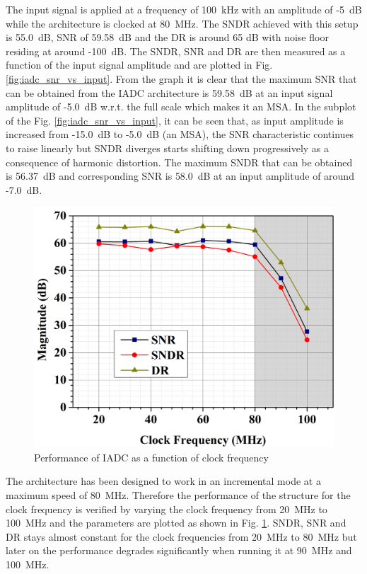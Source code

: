 The input signal is applied at a frequency of 100~kHz with an amplitude of -5~dB while the architecture is clocked at 80~MHz. The SNDR achieved with this setup is 55.0~dB, SNR of 59.58~dB and the DR is around 65 dB with noise floor residing at around -100~dB. The SNDR, SNR and DR are then measured as a function of the input signal amplitude and are plotted in Fig. \ref{fig:iadc_snr_vs_input}. From the graph it is clear that the maximum SNR that can be obtained from the IADC architecture is 59.58~dB at an input signal amplitude of -5.0~dB w.r.t. the full scale which makes it an MSA. In the subplot of the Fig. \ref{fig:iadc_snr_vs_input}, it can be seen that, as input amplitude is increased from -15.0~dB to -5.0~dB (an MSA), the SNR characteristic continues to raise linearly but SNDR diverges starts shifting down progressively as a consequence of harmonic distortion. The maximum SNDR that can be obtained is 56.37~dB and corresponding SNR is 58.0~dB at an input amplitude of around -7.0~dB. 

%
\begin{figure}[h!]
    \centering
    \includegraphics[width=0.8\columnwidth]{Chap06/Figures/snr_vs_fck.jpg}
    \caption{Performance of IADC as a function of clock frequency }
    \label{fig:iadc_snr_vs_clk}
\end{figure}
%

The architecture has been designed to work in an incremental mode at a maximum speed of 80~MHz. Therefore the performance of the structure for the clock frequency is verified by varying the clock frequency from 20~MHz to 100~MHz and the parameters are plotted as shown in Fig. \ref{fig:iadc_snr_vs_clk}. SNDR, SNR and DR stays almost constant for the clock frequencies from 20~MHz to 80~MHz but later on the performance degrades significantly when running it at 90~MHz and 100~MHz.


